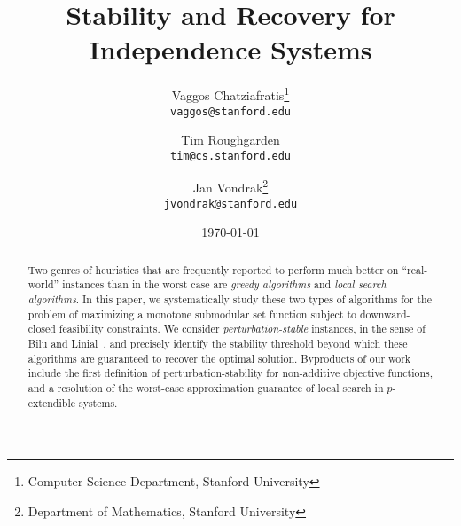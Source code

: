 \documentclass[11pt]{article}
\title{Stability and Recovery for Independence Systems}
\author{Vaggos Chatziafratis\thanks{Computer Science Department, Stanford University}\\{\tt vaggos@stanford.edu}\and Tim Roughgarden\footnotemark[1]\\{\tt tim@cs.stanford.edu}\and Jan Vondrak\thanks{Department of Mathematics, Stanford University}\\{\tt jvondrak@stanford.edu}}
\date{\today}
\theoremstyle{break}
{\theorembodyfont{\rmfamily} \newtheorem{remarkbreak}		[theorem]
{Remark}}
\begin{document}
\maketitle


\begin{abstract}
Two genres of
  heuristics that are frequently reported to perform much better on
  ``real-world'' instances than in the worst case are {\em greedy
    algorithms} and {\em local search algorithms}.  In this paper, we
  systematically study these two types of algorithms for the problem
  of maximizing a monotone submodular set function subject to
  downward-closed feasibility constraints.  We consider {\em
    perturbation-stable} instances, in the sense of Bilu and
  Linial~\cite{bilu2012stable}, and precisely identify the stability
  threshold beyond which these algorithms are guaranteed to recover
  the optimal solution.  Byproducts of our work include the first
  definition of perturbation-stability for non-additive objective
  functions, and a resolution of the worst-case approximation
  guarantee of local search in $p$-extendible systems.

\end{abstract}
\clearpage










\appendix








\end{document}
